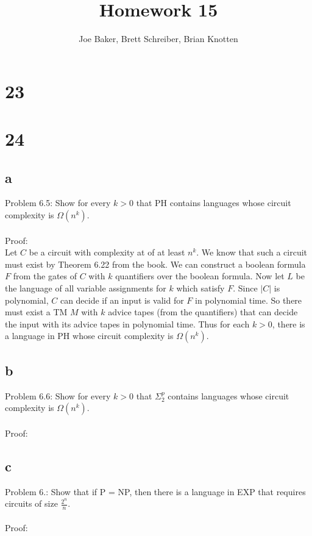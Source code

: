 \documentclass[letterpaper,notitlepage,twoside]{article}
\begin{document}
\title{Homework 15}
\author{Joe Baker, Brett Schreiber, Brian Knotten}
\maketitle

\section*{23}

\section*{24}

\subsection*{a}
Problem 6.5: Show for every $k > 0$ that PH contains languages whose circuit complexity is $\Omega\left(n^k\right)$.
\\\\
Proof:
\\
Let $C$ be a circuit with complexity at of at least $n^k$. We know that such a circuit must exist by Theorem 6.22 from the book. We can construct a boolean formula $F$ from the gates of $C$ with $k$ quantifiers over the boolean formula. Now let $L$ be the language of all variable assignments for $k$ which satisfy $F$. Since $\left| C \right|$ is polynomial, $C$ can decide if an input is valid for $F$ in polynomial time. So there must exist a TM $M$ with $k$ advice tapes (from the quantifiers) that can decide the input with its advice tapes in polynomial time. Thus for each $k > 0$, there is a language in PH whose circuit complexity is $\Omega\left(n^k\right)$.

\subsection*{b}
Problem 6.6: Show for every $k > 0$ that $\Sigma_2^p$ contains languages whose circuit complexity is $\Omega\left(n^k\right)$.
\\\\
Proof:
\\


\subsection*{c}
Problem 6.: Show that if P = NP, then there is a language in EXP that requires circuits of size $\frac{2^n}{n}$.
\\\\
Proof:
\\
\end{document}
